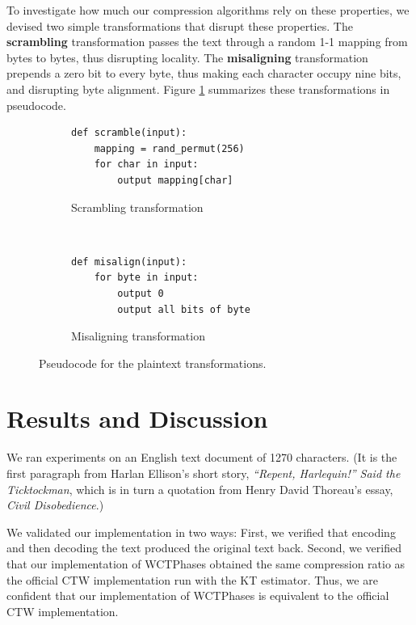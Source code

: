 \documentclass[11pt]{scrartcl}
\begin{document}
To investigate how much our compression algorithms rely on these properties, we
devised two simple transformations that disrupt these properties. The {\bf
scrambling} transformation passes the text through a random 1-1 mapping from
bytes to bytes, thus disrupting locality. The {\bf misaligning} transformation
prepends a zero bit to every byte, thus making each character occupy nine bits,
and disrupting byte alignment. Figure \ref{fig:transformations} summarizes
these transformations in pseudocode.

\begin{figure}[h!]
    \centering
    \begin{subfigure}[b]{0.45\textwidth}
\begin{verbatim}
def scramble(input):
    mapping = rand_permut(256)
    for char in input:
        output mapping[char] \end{verbatim}
        \caption{Scrambling transformation}
    \end{subfigure}
    ~
    \begin{subfigure}[b]{0.45\textwidth}
\begin{verbatim}
def misalign(input):
    for byte in input:
        output 0
        output all bits of byte \end{verbatim}
        \caption{Misaligning transformation}
    \end{subfigure}
    \caption{Pseudocode for the plaintext transformations.}
    \label{fig:transformations}
\end{figure}



\section{Results and Discussion}
\label{sec:results}

We ran experiments on an English text document of 1270 characters. (It is the
first paragraph from Harlan Ellison's short story, {\em ``Repent, Harlequin!''
Said the Ticktockman}, which is in turn a quotation from Henry David Thoreau's
essay, {\em Civil Disobedience}.)

We validated our implementation in two ways: First, we verified that encoding
and then decoding the text produced the original text back. Second, we verified
that our implementation of WCTPhases obtained the same compression ratio as the
official CTW implementation run with the KT estimator. Thus, we are confident
that our implementation of WCTPhases is equivalent to the official CTW
implementation.
\end{document}
